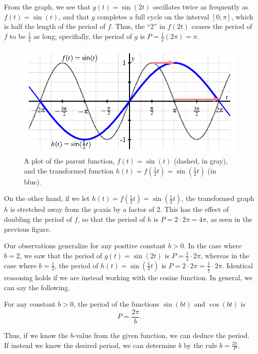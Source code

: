 \documentclass{ximera}
\begin{document}
From the graph, we see that \(g(t) = \sin(2t)\) oscillates twice as frequently as \(f(t) = \sin(t)\), and that \(g\) completes a full cycle on the interval \([0,\pi]\), which is half the length of the period of \(f\).  Thus, the  ``\(2\)'' in \(f(2t)\) causes the period of \(f\) to be \(\frac{1}{2}\) as long; specifially, the period of \(g\) is \(P = \frac{1}{2} (2\pi) = \pi\).%
\begin{figure}
\centering
\includegraphics[width=0.75\linewidth]{images/sinusoidal-sine-horiz-scaling-2.png}
\caption{A plot of the parent function, \(f(t) = \sin(t)\) (dashed, in gray), and the transformed function \(h(t) = f\left(\frac{1}{2}t\right) = \sin\left(\frac{1}{2}t\right)\) (in blue).\label{F-sinusoidal-sine-stretched}}
\end{figure}

On the other hand, if we let \(h(t) = f\left(\frac{1}{2}t\right) = \sin\left(\frac{1}{2}t\right)\), the transformed graph \(h\) is stretched away from the \(y\)-axis by a factor of \(2\).  This has the effect of doubling the period of \(f\), so that the period of \(h\) is \(P = 2 \cdot 2\pi = 4\pi\), as seen in the previous figure.%

Our observations generalize for any positive constant \(b > 0\).  In the case where \(b = 2\), we saw that the period of \(g(t) = \sin(2t)\) is \(P = \frac{1}{2} \cdot 2\pi\), whereas in the case where \(b = \frac{1}{2}\), the period of \(h(t) = \sin(\frac{1}{2}t)\) is \(P = 2 \cdot 2\pi = \frac{1}{\frac{1}{2}} \cdot 2\pi\).  Identical reasoning holds if we are instead working with the cosine function.  In general, we can say the following.%

For any constant \(b > 0\), the period of the functions \(\sin(bt)\) and \(\cos(bt)\) is%
\[
P = \frac{2\pi}{b}\text{.}
\]
%

Thus, if we know the \(b\)-value from the given function, we can deduce the period.  If instead we know the desired period, we can determine \(b\) by the rule \(b = \frac{2\pi}{P}\).%
\end{document}
